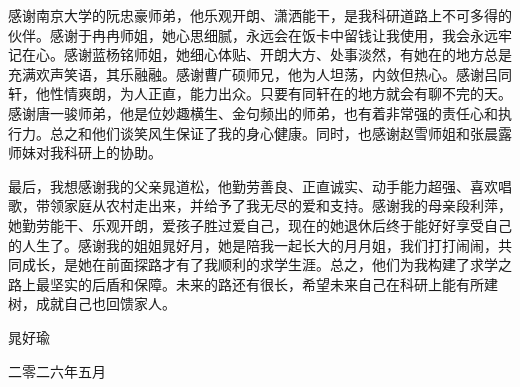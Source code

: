 感谢南京大学的阮忠豪师弟，他乐观开朗、潇洒能干，是我科研道路上不可多得的伙伴。感谢于冉冉师姐，她心思细腻，永远会在饭卡中留钱让我使用，我会永远牢记在心。感谢蓝杨铭师姐，她细心体贴、开朗大方、处事淡然，有她在的地方总是充满欢声笑语，其乐融融。感谢曹广硕师兄，他为人坦荡，内敛但热心。感谢吕同轩，他性情爽朗，为人正直，能力出众。只要有同轩在的地方就会有聊不完的天。感谢唐一骏师弟，他是位妙趣横生、金句频出的师弟，也有着非常强的责任心和执行力。总之和他们谈笑风生保证了我的身心健康。同时，也感谢赵雪师姐和张晨露师妹对我科研上的协助。

最后，我想感谢我的父亲晁道松，他勤劳善良、正直诚实、动手能力超强、喜欢唱歌，带领家庭从农村走出来，并给予了我无尽的爱和支持。感谢我的母亲段利萍，她勤劳能干、乐观开朗，爱孩子胜过爱自己，现在的她退休后终于能好好享受自己的人生了。感谢我的姐姐晁好月，她是陪我一起长大的月月姐，我们打打闹闹，共同成长，是她在前面探路才有了我顺利的求学生涯。总之，他们为我构建了求学之路上最坚实的后盾和保障。未来的路还有很长，希望未来自己在科研上能有所建树，成就自己也回馈家人。

\hfill 晁好瑜

\hfill 二零二六年五月


